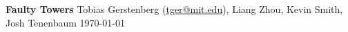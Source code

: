 \documentclass[11pt]{article}
\begin{document}
\begin{center} 
{\LARGE \textbf{Faulty Towers}}
\linebreak
\linebreak
{\large Tobias Gerstenberg (\href{mailto:tger@mit.edu}{tger@mit.edu}),
 Liang Zhou, Kevin Smith, Josh Tenenbaum}
\linebreak
\today
\end{center} 

\tableofcontents 
\clearpage






\end{document}
